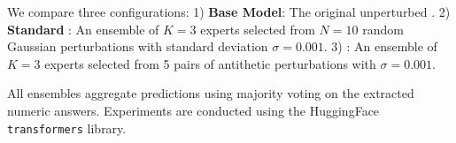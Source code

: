 We compare three configurations:
1) \textbf{Base Model}: The original unperturbed \qwen.
2) \textbf{Standard \randopt}: An ensemble of $K=3$ experts selected from $N=10$ random Gaussian perturbations with standard deviation $\sigma=0.001$.
3) \textbf{\methodname}: An ensemble of $K=3$ experts selected from 5 pairs of antithetic perturbations with $\sigma=0.001$.

All ensembles aggregate predictions using majority voting on the extracted numeric answers. Experiments are conducted using the HuggingFace \texttt{transformers} library.